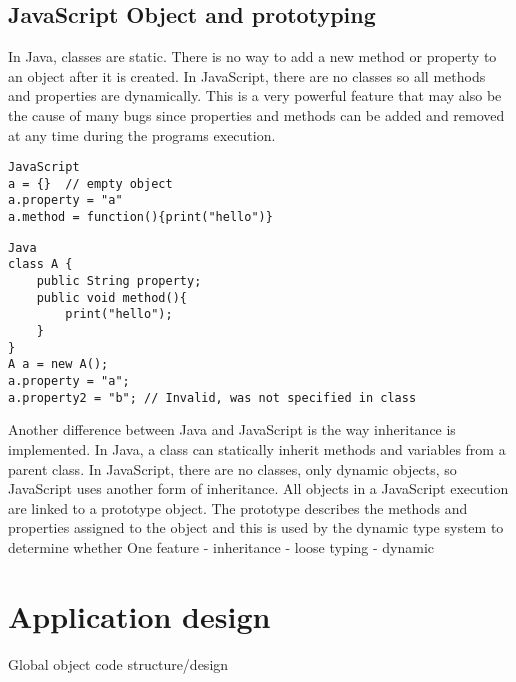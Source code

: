 \documentclass{report}
\begin{document}
	\subsection{JavaScript Object and prototyping}
	In Java, classes are static. There is no way to add a new method or property to an object after it is created. In JavaScript, there are no classes so all methods and properties are dynamically. This is a very powerful feature that may also be the cause of many bugs since properties and methods can be added and removed at any time during the programs execution.
\begin{verbatim}
JavaScript
a = {} 	// empty object
a.property = "a"
a.method = function(){print("hello")}
\end{verbatim}

\begin{verbatim}
Java
class A {
	public String property;
	public void method(){
		print("hello");
	}
}
A a = new A();
a.property = "a";
a.property2 = "b"; // Invalid, was not specified in class
\end{verbatim}

Another difference between Java and JavaScript is the way inheritance is implemented. In Java, a class can statically inherit methods and variables from a parent class. In JavaScript, there are no classes, only dynamic objects, so JavaScript uses another form of inheritance. All objects in a JavaScript execution are linked to a prototype object. The prototype describes the methods and properties assigned to the object and this is used by the dynamic type system to determine whether 
	One feature
	- inheritance
	- loose typing
	- dynamic
\section{Application design}
	Global object
	code structure/design
\end{document}
